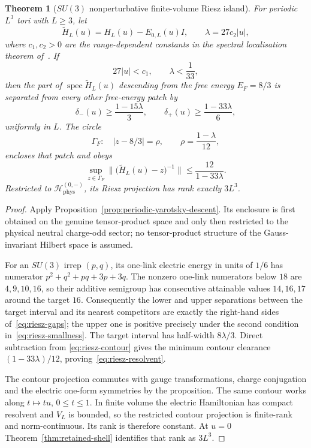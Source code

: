\documentclass[11pt]{article}
\theoremstyle{plain}
\newtheorem{theorem}{Theorem}
\theoremstyle{definition}
\theoremstyle{remark}
\begin{document}
\begin{theorem}[$SU(3)$ nonperturbative finite-volume Riesz island]
\label{thm:riesz-island}
For periodic $L^3$ tori with $L\ge3$, let
\[
 \widetilde H_L(u)=H_L(u)-E_{0,L}(u)I,
 \qquad \lambda=27c_2|u|,
\]
where $c_1,c_2>0$ are the range-dependent constants in the spectral
localisation theorem of~\cite{Yarotsky2004QP}. If
\begin{equation}\label{eq:riesz-smallness}
 27|u|<c_1,
 \qquad \lambda<\frac1{33},
\end{equation}
then the part of $\operatorname{spec}\widetilde H_L(u)$ descending from the
free energy $E_F=8/3$ is separated from every other free-energy patch by
\begin{equation}\label{eq:riesz-gaps}
 \delta_-(u)\ge\frac{1-15\lambda}{3},
 \qquad
 \delta_+(u)\ge\frac{1-33\lambda}{6},
\end{equation}
uniformly in $L$. The circle
\begin{equation}\label{eq:riesz-contour}
 \Gamma_F:\quad |z-8/3|=\rho,
 \qquad \rho=\frac{1-\lambda}{12},
\end{equation}
encloses that patch and obeys
\begin{equation}\label{eq:riesz-resolvent}
 \sup_{z\in\Gamma_F}
 \|\bigl(\widetilde H_L(u)-z\bigr)^{-1}\|
 \le\frac{12}{1-33\lambda}.
\end{equation}
Restricted to $\mathcal H_{\mathrm{phys}}^{(0,-)}$, its Riesz projection has
rank exactly $3L^3$.
\end{theorem}

\begin{proof}
Apply Proposition~\ref{prop:periodic-yarotsky-descent}.  Its enclosure is
first obtained on the genuine tensor-product space and only then restricted
to the physical neutral charge-odd sector; no tensor-product structure of the
Gauss-invariant Hilbert space is assumed.

For an $SU(3)$ irrep $(p,q)$, its one-link electric energy in units of $1/6$
has numerator
$p^2+q^2+pq+3p+3q$. The nonzero one-link numerators below $18$ are
$4,9,10,16$, so their additive semigroup has consecutive attainable values
$14,16,17$ around the target $16$. Consequently the lower and upper
separations between the target interval and its nearest competitors are
exactly the right-hand sides of~\eqref{eq:riesz-gaps}; the upper one is
positive precisely under the second condition in~\eqref{eq:riesz-smallness}.
The target interval has half-width $8\lambda/3$. Direct subtraction from
\eqref{eq:riesz-contour} gives the minimum contour clearance
$(1-33\lambda)/12$, proving~\eqref{eq:riesz-resolvent}.

The contour projection commutes with gauge transformations, charge
conjugation and the electric one-form symmetries by the proposition.  The same
contour works along $t\mapsto tu$, $0\le t\le1$.  In finite volume the electric
Hamiltonian has compact resolvent and $V_L$ is bounded, so the restricted
contour projection is finite-rank and norm-continuous.  Its rank is therefore
constant. At $u=0$ Theorem~\ref{thm:retained-shell} identifies that rank as
$3L^3$.
\end{proof}
\end{document}
